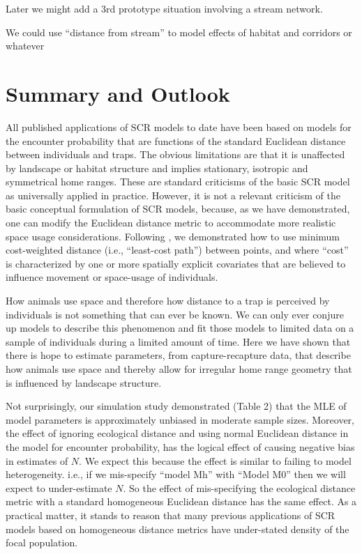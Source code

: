 Later we might add a 3rd prototype situation involving a stream network. 

We could use ``distance from stream'' to model effects of habitat
and corridors or whatever


\section{Summary and Outlook}


All published applications of SCR models to date have been based on models for the
encounter probability that are functions of the standard Euclidean
distance between individuals and traps. The obvious limitations are
that it is unaffected by landscape or habitat structure and implies
stationary, isotropic and symmetrical home ranges. These are standard
criticisms of the basic SCR model as universally applied in
practice. However, it is not a relevant criticism of the basic
conceptual formulation of SCR models, because, as we have
demonstrated, one can modify the Euclidean distance metric to
accommodate more realistic space usage considerations.  Following
\citet{royle_etal:2012ecol},
we demonstrated how to use 
minimum cost-weighted distance (i.e., ``least-cost
path'') between points, and where ``cost'' is characterized by one or
more spatially explicit covariates that are believed to influence
movement or space-usage of individuals. 

How animals use space and therefore how distance to a trap is
perceived by individuals is not something that can ever be known. We
can only ever conjure up models to describe this phenomenon and fit
those models to limited data on a sample of individuals during a
limited amount of time.  Here we have shown that there is hope to
estimate parameters, from capture-recapture data, that describe how
animals use space and thereby allow for irregular home range geometry
that is influenced by landscape structure.

Not surprisingly, our simulation study demonstrated
(Table 2) that the MLE of model parameters is
approximately unbiased in moderate sample sizes. Moreover, the effect
of ignoring ecological distance and using normal Euclidean distance in
the model for encounter probability, has the logical effect of causing
negative bias in estimates of $N$.  We expect this because the effect
is similar to failing to model heterogeneity. i.e., if we mis-specify
``model Mh'' \citep{otis_etal:1978} with ``Model M0''
\citep{otis_etal:1978} then we will expect to under-estimate $N$. So
the effect of mis-specifying the ecological distance metric with a
standard homogeneous Euclidean distance has the same effect. As a
practical matter, it stands to reason that many previous applications
of SCR models based on homogeneous distance metrics have under-stated
density of the focal population.

